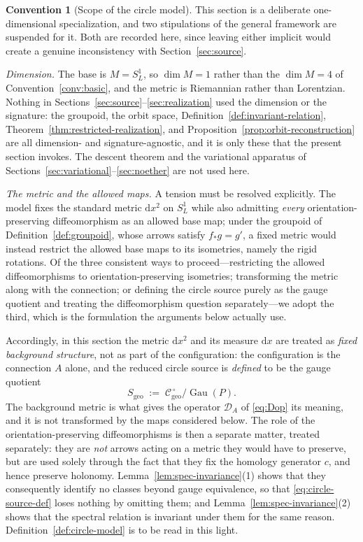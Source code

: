 \documentclass[11pt,a4paper]{article}
\theoremstyle{plain}
\theoremstyle{definition}
\newtheorem{convention}[theorem]{Convention}
\theoremstyle{remark}
\newcommand{\Cgeo}{\mathcal{C}_{\mathrm{geo}}}
\newcommand{\Sgeo}{S_{\mathrm{geo}}}
\newcommand{\Gau}{\operatorname{Gau}}
\begin{document}
\begin{convention}[Scope of the circle model]
\label{conv:circle-scope}
This section is a deliberate one-dimensional specialization, and two stipulations of the general
framework are suspended for it. Both are recorded here, since leaving either implicit would create a
genuine inconsistency with Section~\ref{sec:source}.

\emph{Dimension.} The base is $M=S^1_L$, so $\dim M=1$ rather than the $\dim M=4$ of
Convention~\ref{conv:basic}, and the metric is Riemannian rather than Lorentzian. Nothing in
Sections~\ref{sec:source}--\ref{sec:realization} used the dimension or the signature: the groupoid,
the orbit space, Definition~\ref{def:invariant-relation}, Theorem~\ref{thm:restricted-realization},
and Proposition~\ref{prop:orbit-reconstruction} are all dimension- and signature-agnostic, and it is
only these that the present section invokes. The descent theorem and the variational apparatus of
Sections~\ref{sec:variational}--\ref{sec:noether} are not used here.

\emph{The metric and the allowed maps.} A tension must be resolved explicitly. The model fixes the
standard metric $\mathrm{d}x^{2}$ on $S^1_L$ while also admitting \emph{every}
orientation-preserving diffeomorphism as an allowed base map; under the groupoid of
Definition~\ref{def:groupoid}, whose arrows satisfy $f_*g=g'$, a fixed metric would instead restrict
the allowed base maps to its isometries, namely the rigid rotations. Of the three consistent ways to
proceed---restricting the allowed diffeomorphisms to orientation-preserving isometries; transforming
the metric along with the connection; or defining the circle source purely as the gauge quotient and
treating the diffeomorphism question separately---we adopt the third, which is the formulation the
arguments below actually use.

Accordingly, in this section the metric $\mathrm{d}x^{2}$ and its measure $\mathrm{d}x$ are treated
as \emph{fixed background structure}, not as part of the configuration: the configuration is the
connection $A$ alone, and the reduced circle source is \emph{defined} to be the gauge quotient
\begin{equation}
\label{eq:circle-source-def}
\Sgeo \;:=\; \Cgeo^{\,\circ}\big/\Gau(P) .
\end{equation}
The background metric is what gives the operator $\mathcal{D}_A$ of \eqref{eq:Dop} its meaning, and
it is not transformed by the maps considered below. The role of the orientation-preserving
diffeomorphisms is then a separate matter, treated separately: they are \emph{not} arrows acting on
a metric they would have to preserve, but are used solely through the fact that they fix the
homology generator $c$, and hence preserve holonomy. Lemma~\ref{lem:spec-invariance}(1) shows that
they consequently identify no classes beyond gauge equivalence, so that \eqref{eq:circle-source-def}
loses nothing by omitting them; and Lemma~\ref{lem:spec-invariance}(2) shows that the spectral
relation is invariant under them for the same reason. Definition~\ref{def:circle-model} is to be
read in this light.
\end{convention}
\end{document}
